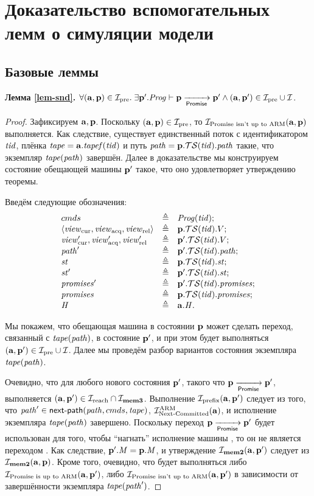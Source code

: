 \chapter{Доказательство  вспомогательных лемм о симуляции модели \ARMt}
\label{sec:appendix-pop-proofs}

\section{Базовые леммы}

\noindent
\textbf{Лемма \ref{lem-snd}.}
$\forall (\aT, \p) \in \simrelPre. \;
\exists \p'. \Cfprom \vdash \p \promStep \p' \land (\aT, \p') \in \simrelPre \cup \simrel$.
\begin{proof}
Зафиксируем $\aT, \p$.
Поскольку $(\aT, \p) \in \simrelPre$, то $\invPromUptoARMnot(\aT, \p)$ выполняется.
Как следствие, существует единственный поток с идентификатором $\tId$, плёнка $\tape = \aT.\tapef(\tId)$ и
путь $\cpath = \p.\TSfprom(\tId).\cpath$ такие, что экземпляр $\tape(\cpath)$ завершён.
Далее в доказательстве мы конструируем состояние обещающей машины $\p'$ такое, что 
оно удовлетворяет утверждению теоремы.

Введём следующие обозначения:
\[\begin{array}{l l l}
  \Carm & \triangleq & \Cfarm(\tId); \\
  \angled{\Rcur, \Racq, \Rrel} & \triangleq & \p.\TSfprom(\tId).\V; \\
  \Rcur', \Racq', \Rrel' & \triangleq & \p'.\TSfprom(\tId).\V;\\
  \cpath' & \triangleq & \p'.\TSfprom(\tId).\cpath;\\
  \PromState & \triangleq & \p.\TSfprom(\tId).\PromState;\\
  \PromState' & \triangleq & \p'.\TSfprom(\tId).\PromState;\\
  \PromSet' & \triangleq & \p'.\TSfprom(\tId).\PromSet;\\
  \PromSet & \triangleq & \p.\TSfprom(\tId).\PromSet;\\
  \hmap   & \triangleq & \aT.\hmap.
\end{array}\]

Мы покажем, что обещающая машина в состоянии $\p$ может сделать переход, связанный с $\tape(\cpath)$, в состояние $\p'$,
и при этом будет выполняться $(\aT, \p') \in \simrelPre \cup \simrel$.
Далее мы проведём разбор вариантов состояния экземпляра $\tape(\cpath)$.

Очевидно, что для любого нового состояния $\p'$, такого что $\p \promStep \p'$, выполняется 
$(\aT, \p') \in \invReach \cap \invMemThree$.
Выполнение $\invPrefix(\aT, \p')$ следует из того, что
  $\cpath' \in \nextPathCom{\cpath}{\Carm}{\tape}$, $\invAnextCommitted(\aT)$, и исполнение экземпляра $\tape(\cpath)$ завершено.
Поскольку переход $\p \promStep \p'$ будет использован для того, чтобы ``нагнать'' исполнение машины \ARMt,
то он не является переходом . Как следствие, $\p'.\Mprom = \p.\Mprom$, и 
утверждение $\invMemTwo(\aT, \p')$ следует из $\invMemTwo(\aT, \p)$.
Кроме того, очевидно, что будет выполняться
либо $\invPromUptoARM(\aT, \p')$, либо $\invPromUptoARMnot(\aT, \p')$ в зависимости от
завершённости экземпляра $\tape(\cpath')$.


\end{proof}
